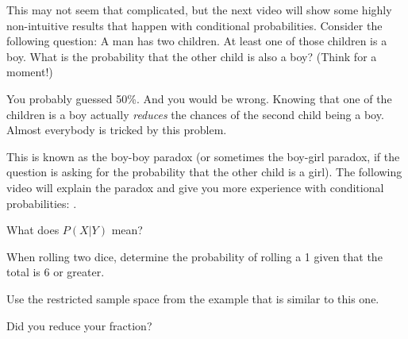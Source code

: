 \documentclass{ximera}
\begin{document}
This may not seem that complicated, but the next video will show some highly non-intuitive results that happen with conditional probabilities. Consider the following question: A man has two children. At least one of those children is a boy. What is the probability that the other child is also a boy? (Think for a moment!)

You probably guessed 50\%. And you would be wrong. Knowing that one of the children is a boy actually \emph{reduces} the chances of the second child being a boy. Almost everybody is tricked by this problem.

This is known as the boy-boy paradox (or sometimes the boy-girl paradox, if the question is asking for the probability that the other child is a girl). The following video will explain the paradox and give you more experience with conditional probabilities: .

\begin{question}
What does $P(X|Y)$ mean?
  \begin{solution}
    \begin{multiple-choice}
    \end{multiple-choice}
  \end{solution}
\end{question}

\begin{question}
When rolling two dice, determine the probability of rolling a 1 given that the total is 6 or greater.
  \begin{solution}
    \begin{multiple-choice}
    \end{multiple-choice}
    \begin{hint}
      Use the restricted sample space from the example that is similar to this one.
    \end{hint}
    \begin{hint}
      Did you reduce your fraction?
    \end{hint}
  \end{solution}
\end{question}
\end{document}

